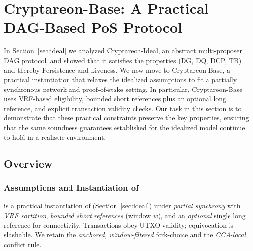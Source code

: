 
\section{Cryptareon-Base: A Practical DAG-Based PoS Protocol}
\label{sec:base}
In Section~\ref{sec:ideal} we analyzed Cryptareon-Ideal, an abstract multi-proposer DAG protocol, and showed that it satisfies the properties (DG, DQ, DCP, TB) and thereby Persistence and Liveness. We now move to Cryptareon-Base, a practical instantiation that relaxes the idealized assumptions to fit a partially synchronous network and proof-of-stake setting. In particular, Cryptareon-Base uses VRF-based eligibility, bounded short references plus an optional long reference, and explicit transaction validity checks. Our task in this section is to demonstrate that these practical constraints preserve the key properties, ensuring that the same soundness guarantees established for the idealized model continue to hold in a realistic environment.

\subsection{Overview}  

\subsubsection{Assumptions and Instantiation of \ProjIdeal}
\label{subsec:base-overview}
\ProjBase is a practical instantiation of \ProjIdeal (Section~\ref{sec:ideal}) under \emph{partial synchrony} with \emph{VRF sortition}, \emph{bounded short references} (window $w$), and an \emph{optional} single long reference for connectivity. Transactions obey UTXO validity; equivocation is slashable. We retain the \emph{anchored, window-filtered} fork-choice and the \emph{CCA-local} conflict rule.

